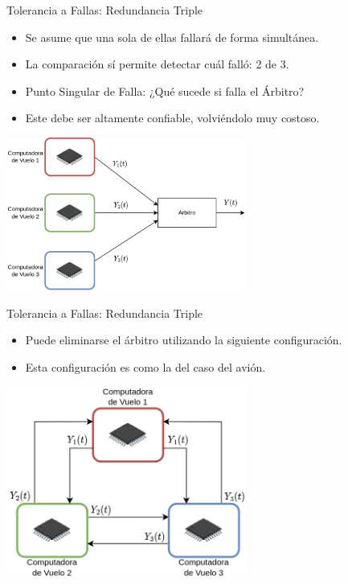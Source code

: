 \begin{frame}{Tolerancia a Fallas: Redundancia Triple}
	\begin{itemize}
		\item Se asume que una sola de ellas fallará de forma simultánea.
		\item La comparación sí permite detectar cuál falló: 2 de 3.
		\item Punto Singular de Falla: ¿Qué sucede si falla el Árbitro?
		\item Este debe ser altamente confiable, volviéndolo muy costoso.
	\end{itemize}
	\begin{center}
		\includegraphics[width=0.6\textwidth]{img/redundancia_triple.png}
	\end{center}
\end{frame}

\begin{frame}{Tolerancia a Fallas: Redundancia Triple}
	\begin{itemize}
		\item Puede eliminarse el árbitro utilizando la siguiente configuración.
		\item Esta configuración es como la del caso del avión.
	\end{itemize}
	\begin{center}
		\includegraphics[width=0.6\textwidth]{img/redundancia_triple_sin_arbitro.png}
	\end{center}
\end{frame}

